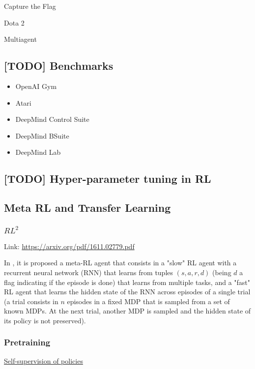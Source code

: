 \documentclass[12pt, english]{article}
\begin{document}
Capture the Flag \cite{}

Dota 2 \cite{}

Multiagent \cite{}



\subsection{[TODO] Benchmarks}

\begin{itemize}
  \item OpenAI Gym
  \item Atari
  \item DeepMind Control Suite
  \item DeepMind BSuite
  \item DeepMind Lab
\end{itemize}

\subsection{[TODO] Hyper-parameter tuning in RL}



\subsection{Meta RL and Transfer Learning}

\subsubsection{$RL^2$}

Link: \url{https://arxiv.org/pdf/1611.02779.pdf}

In \cite{duan_rl2_2016}, it is proposed a meta-RL agent that consists in a "slow" RL agent with a recurrent neural network (RNN) that learns from tuples $(s,a,r,d)$ (being $d$ a flag indicating if the episode is done) that learns from multiple tasks, and a "fast" RL agent that learns the hidden state of the RNN across episodes of a single trial (a trial consists in $n$ episodes in a fixed MDP that is sampled from a set of known MDPs. At the next trial, another MDP is sampled and the hidden state of its policy is not preserved).


\subsubsection{Pretraining}

\underline{Self-supervision of policies}
\end{document}
